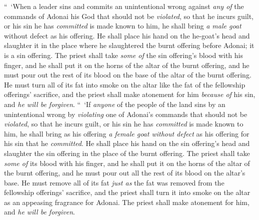 \begin{biblechapter}
\verse “ ‘When a leader sins and commits an unintentional wrong against \textit{any of} the commands of Adonai his God that should not be \textit{violated}, so that he incurs guilt,
\verse or his sin he has \textit{committed} is made known to him, he shall bring \textit{a male goat} without defect as his offering.
\verse He shall place his hand on the he-goat’s head and slaughter it in the place where he slaughtered the burnt offering before Adonai; it is a sin offering.
\verse The priest shall take \textit{some of} the sin offering’s blood with his finger, and he shall put it on the horns of the altar of the burnt offering, and he must pour out the rest of its blood on the base of the altar of the burnt offering.
\verse He must turn all of its fat into smoke on the altar like the fat of the fellowship offerings’ sacrifice, and the priest shall make atonement for him \textit{because of} his sin, and \textit{he will be forgiven}.
\verse “ ‘If \textit{anyone} of the people of the land sins by an unintentional wrong by \textit{violating} one of Adonai’s commands that should not be \textit{violated}, so that he incurs guilt,
\verse or his sin he has \textit{committed} is made known to him, he shall bring as his offering \textit{a female goat without defect} as his offering for his sin that he \textit{committed}.
\verse He shall place his hand on the sin offering’s head and slaughter the sin offering in the place of the burnt offering.
\verse The priest shall take \textit{some of} its blood with his finger, and he shall put it on the horns of the altar of the burnt offering, and he must pour out all the rest of its blood on the altar’s base.
\verse He must remove all of its fat \textit{just as} the fat was removed from the fellowship offerings’ sacrifice, and the priest shall turn it into smoke on the altar as an appeasing fragrance for Adonai. The priest shall make atonement for him, and \textit{he will be forgiven}.

\end{biblechapter}
